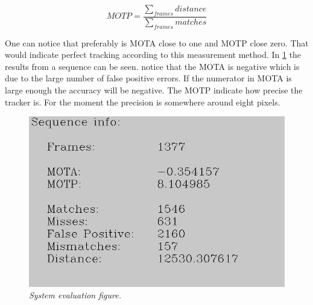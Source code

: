 \begin{equation}
\label{eq:MOTP}
MOTP = \frac{\sum_{frames}{distance}}{\sum_{frames}{matches}}
\end{equation}

One can notice that preferably is MOTA close to one and MOTP close zero. That would indicate perfect tracking according to this measurement method. In \ref{fig:system_evaluation_fig} the results from a sequence can be seen. notice that the MOTA is negative which is due to the large number of false positive errors. If the numerator in MOTA is large enough the accuracy will be negative. The MOTP indicate how precise the tracker is. For the moment the precision is somewhere around eight pixels.

\begin{figure}[htb]
	\centering
	\includegraphics[width=\linewidth]{images/sequenceEvaluation}
	\caption{\textit{System evaluation figure.}}
	\label{fig:system_evaluation_fig} %
\end{figure}



